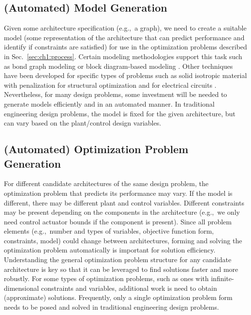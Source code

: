 \subsection{(Automated) Model Generation\label{sec:ch1:modelgen}}

Given some architecture specification (e.g.,~a graph), we need to create a suitable model (some representation of the architecture that can predict performance and identify if constraints are satisfied) for use in the optimization problems described in Sec.~\ref{sec:ch1:process}.
Certain modeling methodologies support this task such as bond graph
modeling \cite{Borutzky2010a} or block diagram-based modeling \cite{matlab-simulink}. 
Other techniques have been developed for specific types of problems such as solid isotropic material with penalization for structural optimization \cite{Bendsoe2004a} and  for electrical circuits \cite{Ho1975a}.
Nevertheless, for many design problems, some investment will be needed to generate models efficiently and in an automated manner.
In traditional engineering design problems, the model is fixed for the given architecture, but can vary based on the plant/control design variables.

\subsection{(Automated) Optimization Problem Generation}

For different candidate architectures of the same design problem,  the optimization problem that predicts its performance may vary.
If the model is different, there may be different plant and control variables.
Different constraints may be present depending on the components in the architecture (e.g.,~we only need control actuator bounds if the component is present).
Since all problem elements (e.g.,~number and types of variables, objective function form, constraints, model) could change between architectures, forming and solving the optimization problem automatically is important for solution efficiency.
Understanding the general optimization problem structure for any candidate architecture is key so that it can be leveraged to find solutions faster and more robustly.
For some types of optimization problems, such as ones with infinite-dimensional constraints and variables, additional work is need to obtain (approximate) solutions.
Frequently, only a single optimization problem form needs to be posed and solved in traditional engineering design problems.